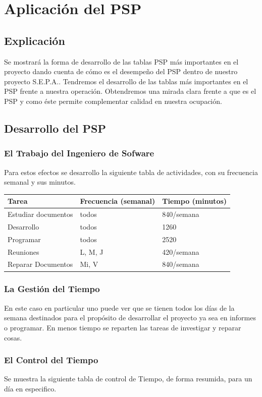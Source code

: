 \documentclass[a4paper,12pt,openany,oneside]{book}
\begin{document}
\chapter{Aplicación del PSP}
\thispagestyle{empty}
\section{Explicación}
Se mostrará la forma de desarrollo de las tablas PSP más importantes en el proyecto dando cuenta de cómo es el desempeño del PSP dentro de nuestro proyecto S.E.P.A.. Tendremos el desarrollo de las tablas más importantes en el PSP frente a nuestra operación. Obtendremos una mirada clara frente a que es el PSP y como éste permite complementar calidad en nuestra ocupación.
\section{Desarrollo del PSP}
\subsection{El Trabajo del Ingeniero de Sofware}
Para estos efectos se desarrollo la siguiente tabla de actividades, con su frecuencia semanal y sus minutos.

\begin{tabular}{|l | l | l |}
\hline
\textbf{Tarea} & \textbf{Frecuencia (semanal)} & \textbf{Tiempo (minutos)} \\
\hline
Estudiar documentos & todos & 840/semana\\
\hline
Desarrollo & todos & 1260\\
\hline
Programar & todos & 2520\\
\hline
Reuniones & L, M, J & 420/semana\\
\hline
Reparar Documentos & Mi, V & 840/semana\\
\hline
\end{tabular}
\subsection{La Gestión del Tiempo}
En este caso en particular uno puede ver que se tienen todos los días de la semana destinados para el propósito de desarrollar el proyecto ya sea en informes o programar. En menos tiempo se reparten las tareas de investigar y reparar cosas.
\subsection{El Control del Tiempo}
Se muestra la siguiente tabla de control de Tiempo, de forma resumida, para un día en especifico.
\end{document}
